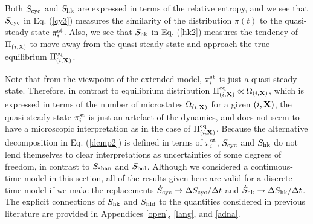 \documentclass[aps,pre,amsmath,amssymb,floatfix,preprint,nofootinbib]{revtex4}
\begin{document}
Both $S_{\rm cyc}$ and $S_{\rm hk}$ are expressed in terms of the relative entropy, and we see that $S_{\rm cyc}$ in Eq. (\ref{cy3}) measures the similarity of the distribution $\pi(t)$ to the quasi-steady state $\pi^{\rm st}_i$. Also, we see that $S_{\rm hk}$ in Eq. (\ref{hk2}) measures the tendency of $\Pi_{(i,\rm X)}$ to move away from the quasi-steady state and approach the true equilibrium $\Pi^{\rm eq}_{(i,{\bf X})}$.  
  
 Note that from the viewpoint of the extended model, $\pi^{\rm st}_i$ is just a quasi-steady state. Therefore, in contrast to equilibrium distribution $\Pi^{\rm eq}_{(i,{\bf X})} \propto \Omega_{(i,{\bf X})}$, which is expressed in terms of the number of microstates $\Omega_{(i,{\bf X})}$ for a given $(i,{\bf X})$, the quasi-steady state $\pi^{\rm st}_i$ is just an artefact of the dynamics, and does not seem to have a microscopic interpretation as in the case of $\Pi^{\rm eq}_{(i,{\bf X})}$. Because the alternative decomposition in Eq. (\ref{dcmp2}) is defined in terms of $\pi^{\rm st}_i$, $S_{\rm cyc}$ and $S_{\rm hk}$ do not lend themselves to clear interpretations as uncertainties of some degrees of freedom, in contrast to $S_{\rm shan}$ and $S_{\rm bol}$. Although we considered a continuous-time model in this section, all of the results given here are valid for a discrete-time model if we make the replacements $\dot S_{\rm cyc} \to \Delta S_{\rm cyc}/\Delta t$ and $\dot S_{\rm hk} \to \Delta S_{\rm hk}/\Delta t$. The explicit connections of $S_{\rm hk}$ and $S_{\rm hid}$ to the quantities considered in previous literature are provided in Appendices \ref{open}, \ref{lang}, and \ref{adna}.
\end{document}
